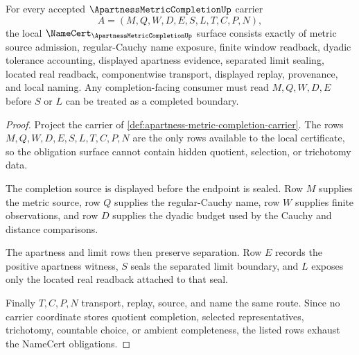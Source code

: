 \begin{theorem}
\label{thm:apartness-metric-completion-namecert-obligations}
For every accepted $\ApartnessMetricCompletionUp$ carrier
$$
A=(M,Q,W,D,E,S,L,T,C,P,N),
$$
the local $\NameCert_{\ApartnessMetricCompletionUp}$ surface consists exactly of metric source admission, regular-Cauchy name exposure, finite window readback, dyadic tolerance accounting, displayed apartness evidence, separated limit sealing, located real readback, componentwise transport, displayed replay, provenance, and local naming. Any completion-facing consumer must read $M,Q,W,D,E$ before $S$ or $L$ can be treated as a completed boundary.
\end{theorem}
\begin{proof}
Project the carrier of \autoref{def:apartness-metric-completion-carrier}. The rows $M,Q,W,D,E,S,L,T,C,P,N$ are the only rows available to the local certificate, so the obligation surface cannot contain hidden quotient, selection, or trichotomy data.

The completion source is displayed before the endpoint is sealed. Row $M$ supplies the metric source, row $Q$ supplies the regular-Cauchy name, row $W$ supplies finite observations, and row $D$ supplies the dyadic budget used by the Cauchy and distance comparisons.

The apartness and limit rows then preserve separation. Row $E$ records the positive apartness witness, $S$ seals the separated limit boundary, and $L$ exposes only the located real readback attached to that seal.

Finally $T,C,P,N$ transport, replay, source, and name the same route. Since no carrier coordinate stores quotient completion, selected representatives, trichotomy, countable choice, or ambient completeness, the listed rows exhaust the NameCert obligations.
\end{proof}

